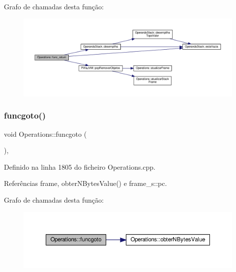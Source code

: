Grafo de chamadas desta função\+:
\nopagebreak
\begin{figure}[H]
\begin{center}
\leavevmode
\includegraphics[width=350pt]{classOperations_aa33b77fb62f7e76c347503c97c6b080b_cgraph}
\end{center}
\end{figure}
\mbox{\label{classOperations_a63d1d75decab8e709a6c5da5e59d8188}} 
\subsubsection{\texorpdfstring{funcgoto()}{funcgoto()}}
{\footnotesize\ttfamily void Operations\+::funcgoto (\begin{DoxyParamCaption}{ }\end{DoxyParamCaption})\hspace{0.3cm}{\ttfamily [static]}, {\ttfamily [private]}}



Definido na linha 1805 do ficheiro Operations.\+cpp.



Referências frame, obter\+N\+Bytes\+Value() e frame\+\_\+s\+::pc.

Grafo de chamadas desta função\+:\nopagebreak
\begin{figure}[H]
\begin{center}
\leavevmode
\includegraphics[width=350pt]{classOperations_a63d1d75decab8e709a6c5da5e59d8188_cgraph}
\end{center}
\end{figure}
\mbox{\label{classOperations_a1880a30623072f8388be782dcf1a390e}} 
